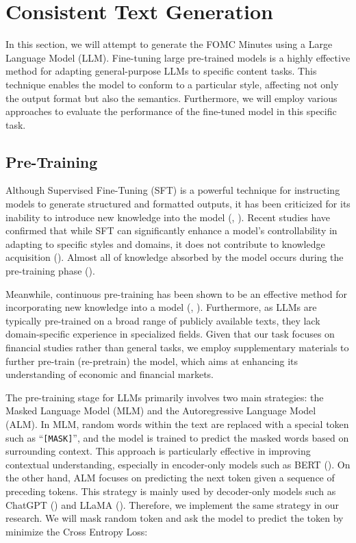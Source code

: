 \section{Consistent Text Generation}\label{ch2:sec:text generation}

In this section, we will attempt to generate the FOMC Minutes using a Large Language Model (LLM). Fine-tuning large pre-trained models is a highly effective method for adapting general-purpose LLMs to specific content tasks. This technique enables the model to conform to a particular style, affecting not only the output format but also the semantics. Furthermore, we will employ various approaches to evaluate the performance of the fine-tuned model in this specific task.



\subsection{Pre-Training}\label{ch2:sec:pre_training}

Although Supervised Fine-Tuning (SFT) is a powerful technique for instructing models to generate structured and formatted outputs, it has been criticized for its inability to introduce new knowledge into the model (\cite{gekhman2024does}, \cite{huang2025survey}). Recent studies have confirmed that while SFT can significantly enhance a model's controllability in adapting to specific styles and domains, it does not contribute to knowledge acquisition (\cite{zhang2023instruction}). Almost all of knowledge absorbed by the model occurs during the pre-training phase (\cite{zhou2023lima}).

Meanwhile, continuous pre-training has been shown to be an effective method for incorporating new knowledge into a model (\cite{parmar2024reuse}, \cite{gekhman2024does}). Furthermore, as LLMs are typically pre-trained on a broad range of publicly available texts, they lack domain-specific experience in specialized fields. Given that our task focuses on financial studies rather than general tasks, we employ supplementary materials to further pre-train (re-pretrain) the model, which aims at enhancing its understanding of economic and financial markets.



The pre-training stage for LLMs primarily involves two main strategies: the Masked Language Model (MLM) and the Autoregressive Language Model (ALM). In MLM, random words within the text are replaced with a special token such as ``\texttt{[MASK]}'', and the model is trained to predict the masked words based on surrounding context. This approach is particularly effective in improving contextual understanding, especially in encoder-only models such as BERT (\cite{bert2018}). On the other hand, ALM focuses on predicting the next token given a sequence of preceding tokens. This strategy is mainly used by decoder-only models such as ChatGPT (\cite{gpt2018}) and LLaMA (\cite{meta2024llama3}). Therefore, we implement the same strategy in our research. We will mask random token and ask the model to predict the token by minimize the Cross Entropy Loss:

